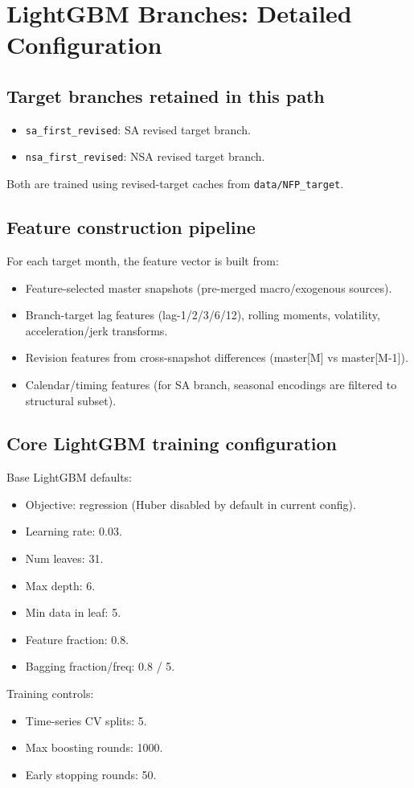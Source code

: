 \documentclass[11pt]{article}
\begin{document}
\section{LightGBM Branches: Detailed Configuration}
\subsection{Target branches retained in this path}
\begin{itemize}
    \item \texttt{sa\_first\_revised}: SA revised target branch.
    \item \texttt{nsa\_first\_revised}: NSA revised target branch.
\end{itemize}
Both are trained using revised-target caches from \texttt{data/NFP\_target}.

\subsection{Feature construction pipeline}
For each target month, the feature vector is built from:
\begin{itemize}
    \item Feature-selected master snapshots (pre-merged macro/exogenous sources).
    \item Branch-target lag features (lag-1/2/3/6/12), rolling moments, volatility, acceleration/jerk transforms.
    \item Revision features from cross-snapshot differences (master[M] vs master[M-1]).
    \item Calendar/timing features (for SA branch, seasonal encodings are filtered to structural subset).
\end{itemize}

\subsection{Core LightGBM training configuration}
Base LightGBM defaults:
\begin{itemize}
    \item Objective: regression (Huber disabled by default in current config).
    \item Learning rate: 0.03.
    \item Num leaves: 31.
    \item Max depth: 6.
    \item Min data in leaf: 5.
    \item Feature fraction: 0.8.
    \item Bagging fraction/freq: 0.8 / 5.
\end{itemize}
Training controls:
\begin{itemize}
    \item Time-series CV splits: 5.
    \item Max boosting rounds: 1000.
    \item Early stopping rounds: 50.
\end{itemize}
\end{document}
